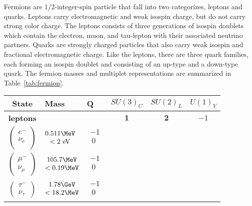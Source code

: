 Fermions are 1/2-integer-spin particle that fall into two categorizes, leptons and quarks.  Leptons carry electromagnetic and weak isospin charge, but do not carry strong color charge.  The leptons consists of three generations of isospin doublets which contain the electron, muon, and tau-lepton with their associated neutrino partners.  Quarks are strongly charged particles that also carry weak isospin and fractional electromagnetic charge.  Like the leptons, there are three quark families, each forming an isospin doublet and consisting of an up-type and a down-type quark.  The fermion masses and multiplet representations are summarized in Table~\ref{tab:fermion}.
\begin{table}[!htp]
\centering
\small
\begin{tabular}{|cllccc|}
\hline
State  & Mass & Q & $SU(3)_{C}$ &  $SU(2)_{L}$ & $U(1)_{Y}$ \\
\hline \hline
\textbf{leptons}&&&$\mathbf{1}$ & $\mathbf{2}$ & $-1$\\
\hline
$\begin{pmatrix}
e^- \\
\nu_e\\
\end{pmatrix}$
&$\begin{matrix}
0.511\MeV \\
<2~\mathrm{eV}\\
\end{matrix}$
&$\begin{matrix}
-1\\
~0\\
\end{matrix}$&&&\\
\hline
$\begin{pmatrix} \mu^-\\ \nu_\mu \end{pmatrix}$
 &$\begin{matrix} 105.7\MeV\\  <0.19\MeV \\ \end{matrix}$
  &$\begin{matrix} -1\\  ~0 \\ \end{matrix}$&&&\\
\hline
$\begin{pmatrix} \tau^- \\ \nu_\tau \end{pmatrix}$
&$\begin{matrix} 1.78\GeV  \\ <18.2\MeV \end{matrix}$
  &$\begin{matrix} -1\\  ~0 \\ \end{matrix}$&&&\\  
\hline 


\end{tabular}
\end{table}
